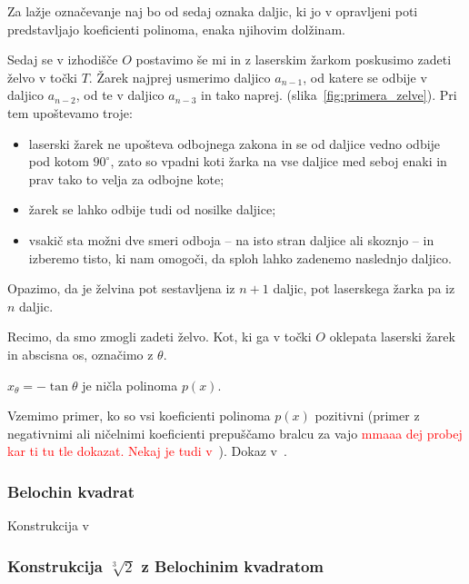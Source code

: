Za lažje označevanje naj bo od sedaj oznaka daljic, ki jo v opravljeni poti predstavljajo koeficienti polinoma, enaka njihovim dolžinam.

Sedaj se v izhodišče $O$ postavimo še mi in z laserskim žarkom poskusimo zadeti želvo v točki $T$. Žarek najprej usmerimo daljico $a_{n-1}$, od katere se odbije v daljico $a_{n-2}$, od te v daljico $a_{n-3}$ in tako naprej. (slika~\ref{fig:primera_zelve}). Pri tem upoštevamo troje:
\begin{itemize}
    \item laserski žarek ne upošteva odbojnega zakona in se od daljice vedno odbije pod kotom $90^\circ$, zato so vpadni koti žarka na vse daljice med seboj enaki in prav tako to velja za odbojne kote;
    \item žarek se lahko odbije tudi od nosilke daljice;
    \item vsakič sta možni dve smeri odboja -- na isto stran daljice ali skoznjo -- in izberemo tisto, ki nam omogoči, da sploh lahko zadenemo naslednjo daljico.
\end{itemize}
Opazimo, da je želvina pot sestavljena iz $n+1$ daljic, pot laserskega žarka pa iz $n$ daljic.

Recimo, da smo zmogli zadeti želvo. Kot, ki ga v točki $O$ oklepata laserski žarek in abscisna os, označimo z $\theta$.

\begin{trditev}
    $x_{\theta} = - \tan \theta$ je ničla polinoma $p(x)$.
\end{trditev}

\begin{dokaz}
    Vzemimo primer, ko so vsi koeficienti polinoma $p(x)$ pozitivni (primer z negativnimi ali ničelnimi koeficienti prepuščamo bralcu za vajo \textcolor{red}{mmaaa dej probej kar ti tu tle dokazat. Nekaj je tudi v~\cite[str.\ 36]{zore2020}}).
    Dokaz v~\cite[str.\ 312]{hull2011}.
\end{dokaz}

\subsubsection{Belochin kvadrat}
Konstrukcija v~\cite[str.\ 309]{hull2011}

\subsubsection*{Konstrukcija $\sqrt[3]{2}$ z Belochinim kvadratom}
\label{podpogl:beloch_kvadrat_koren}

